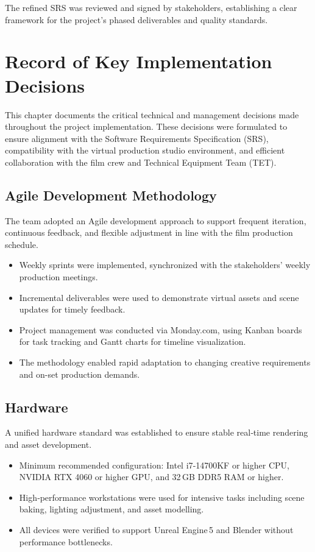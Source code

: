 \documentclass[12pt,a4paper]{report}
\begin{document}
The refined SRS was reviewed and signed by stakeholders, establishing a clear framework for the project's phased deliverables and quality standards.


\chapter{Record of Key Implementation Decisions}

This chapter documents the critical technical and management decisions made throughout the project implementation. These decisions were formulated to ensure alignment with the Software Requirements Specification (SRS), compatibility with the virtual production studio environment, and efficient collaboration with the film crew and Technical Equipment Team (TET).

\section{Agile Development Methodology}
The team adopted an Agile development approach to support frequent iteration, continuous feedback, and flexible adjustment in line with the film production schedule.

\begin{itemize}
    \item Weekly sprints were implemented, synchronized with the stakeholders’ weekly production meetings.
    \item Incremental deliverables were used to demonstrate virtual assets and scene updates for timely feedback.
    \item Project management was conducted via Monday.com, using Kanban boards for task tracking and Gantt charts for timeline visualization.
    \item The methodology enabled rapid adaptation to changing creative requirements and on-set production demands.
\end{itemize}

\section{Hardware}
A unified hardware standard was established to ensure stable real‑time rendering and asset development.

\begin{itemize}
    \item Minimum recommended configuration: Intel i7‑14700KF or higher CPU, NVIDIA RTX 4060 or higher GPU, and 32 GB DDR5 RAM or higher.
    \item High‑performance workstations were used for intensive tasks including scene baking, lighting adjustment, and asset modelling.
    \item All devices were verified to support Unreal Engine 5 and Blender without performance bottlenecks.
\end{itemize}
\end{document}
